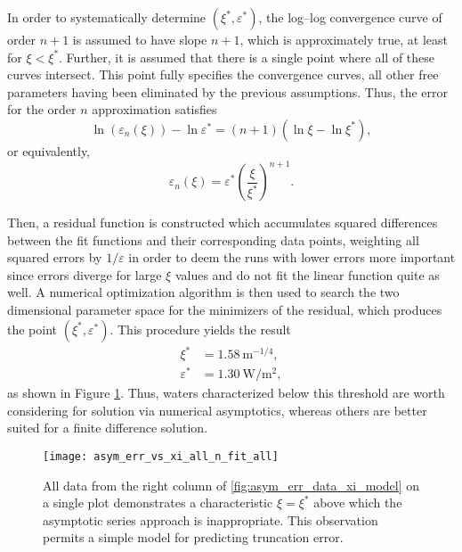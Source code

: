 In order to systematically determine $(\xi^*, \varepsilon^*)$, the log--log convergence curve of order $n+1$ is assumed to have slope $n+1$, which is approximately true, at least for $\xi<\xi^*$.
Further, it is assumed that there is a single point where all of these curves intersect.
This point fully specifies the convergence curves, all other free parameters having been eliminated by the previous assumptions.
Thus, the error for the order $n$ approximation satisfies
\begin{equation}
  \label{eqn:ln_eps_n}
  \ln\left(\varepsilon_n(\xi)\right) - \ln\varepsilon^* = (n+1)\left(\ln\xi - \ln\xi^*\right),
\end{equation}
or equivalently,
\begin{equation}
  \label{eqn:eps_n}
  \varepsilon_n(\xi) = \varepsilon^* \left(\frac{\xi}{\xi^*}\right)^{n+1}.
\end{equation}

Then, a residual function is constructed which accumulates squared differences between the fit functions and their corresponding data points, weighting all squared errors by $1/\varepsilon$ in order to deem the runs with lower errors more important since errors diverge for large $\xi$ values and do not fit the linear function quite as well.
A numerical optimization algorithm is then used to search the two dimensional parameter space for the minimizers of the residual, which produces the point $(\xi^*, \varepsilon^*)$.
This procedure yields the result
\begin{align}
  \xi^* &= \SI{1.58}{\m^{-1/4}}, \\
  \varepsilon^* &= \SI{1.30}{\W\per\m\squared},
\end{align}
as shown in Figure \ref{fig:asym_err_vs_xi_all_n_fit_all}.
Thus, waters characterized below this threshold are worth considering for solution via numerical asymptotics, whereas others are better suited for a finite difference solution.

\begin{figure}[H]
  \centering
  \texttt{[image: asym\_err\_vs\_xi\_all\_n\_fit\_all]}
  \caption{All data from the right column of \ref{fig:asym_err_data_xi_model} on a single plot demonstrates a characteristic $\xi=\xi^*$ above which the asymptotic series approach is inappropriate. This observation permits a simple model for predicting truncation error.}
  \label{fig:asym_err_vs_xi_all_n_fit_all}
\end{figure}

